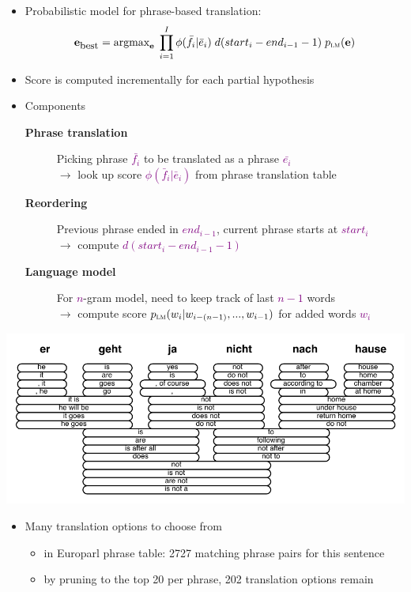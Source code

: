 \documentclass[landscape]{slides}
\newcommand{\maths}[1]{\textcolor{purple}{#1}}
\begin{document}
\begin{itemize}
\item Probabilistic model for phrase-based translation:
\maths{\begin{equation*}
{\bf e}_{\mbox{\small best}} = \text{argmax}_{\bf e} \; \prod_{i=1}^I \phi(\bar{f}_i|\bar{e}_i) \; d(start_i-end_{i-1}-1) \; p_{\text{\sc lm}}({\bf e})
\end{equation*}} \vspace{-10mm}
\item Score is computed incrementally for each partial hypothesis
\item Components
\begin{description}
\item[{\bf Phrase translation}] Picking phrase \maths{$\bar{f_i}$} to be translated as a phrase \maths{$\bar{e_i}$}\\ $\rightarrow$ look up score \maths{$\phi(\bar{f}_i|\bar{e}_i)$} from phrase translation table
\item[{\bf Reordering}] Previous phrase ended in \maths{$end_{i-1}$}, current phrase starts at \maths{$start_i$}\\  $\rightarrow$ compute \maths{$d(start_i-end_{i-1}-1)$}
\item[{\bf Language model}] For \maths{$n$}-gram model, need to keep track of last \maths{$n-1$} words\\  $\rightarrow$ compute score \maths{$p_\text{\sc lm}(w_i|w_{i-(n-1)}, ..., w_{i-1})$} for added words \maths{$w_i$}
\end{description}
\end{itemize}


\begin{center} 
\includegraphics[scale=1.5]{translation-options.pdf}
\end{center}\vspace{-10mm}
\begin{itemize}
\item Many translation options to choose from
\begin{itemize} \vspace{-1mm}
\item in Europarl phrase table: 2727 matching phrase pairs for this sentence
\item by pruning to the top 20 per phrase, 202 translation options remain
\end{itemize}
\end{itemize}
\end{document}
